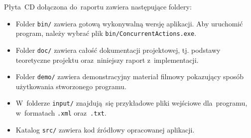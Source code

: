 \documentclass[11pt,a4paper]{article}
\begin{document}
Płyta~CD dołączona do~raportu zawiera następujące foldery:

\begin{itemize}
    \item Folder \verb+bin/+ zawiera gotową wykonywalną wersję aplikacji.
    Aby uruchomić program, należy wybrać plik \verb+bin/ConcurrentActions.exe+.
    \item Folder \verb+doc/+ zawiera całość dokumentacji projektowej, tj. podstawy teoretyczne projektu oraz~niniejszy raport z~implementacji.
    \item Folder \verb+demo/+ zawiera demonstracyjny materiał filmowy pokazujący sposób użytkowania stworzonego programu.
    \item W~folderze \verb+input/+ znajdują~się przykładowe pliki wejściowe dla~programu, w~formatach \verb+.xml+ oraz~\verb+.txt+.
    \item Katalog \verb+src/+ zawiera kod źródłowy opracowanej aplikacji.
\end{itemize}
\end{document}
